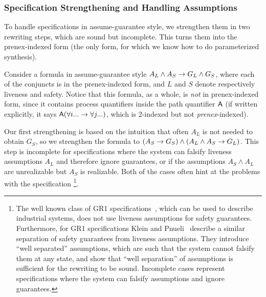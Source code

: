 \subsubsection{Specification Strengthening and Handling Assumptions} \label{tok_rings:sec:localising}

To handle specifications in assume-guarantee style,
we strengthen them in two rewriting steps,
which are sound but incomplete.
This turns them into the prenex-indexed form
(the only form, for which we know how to do parameterized synthesis).

Consider a formula in assume-guarantee style $A_L \land A_S \rightarrow G_L \land G_S$,
where each of the conjuncts is in the prenex-indexed form,
and $L$ and $S$ denote respectively liveness and safety.
Notice that this formula, as a whole,
  is \emph{not} in prenex-indexed form,
  since it contains process quantifiers inside the path quantifier ${\operatorname{\mathsf{A}}}$
  (if written explicitly, it says $\operatorname{\mathsf{A}} (\forall i... \rightarrow \forall j...)$,
  which is 2-indexed but not \emph{prenex}-indexed).

Our first strengthening is based on the intuition that
often $A_L$ is not needed to obtain $G_S$,
so we strengthen the formula to $(A_S \rightarrow G_S) \land (A_L \land A_S \rightarrow G_L)$.
This step is incomplete for specifications where the system can
falsify liveness assumptions $A_L$ and therefore ignore guarantees,
or if the assumptions $A_S \land A_L$ are unrealizable but $A_S$ is realizable.
Both of the cases often hint at the problems with the specification%
\footnote{The well known class of GR1 specifications~\cite{Bloem12},
  which can be used to describe industrial systems,
  does not use liveness assumptions for safety guarantees.
  Furthermore, for GR1 specifications Klein and Pnueli~\cite{Klein10}
  describe a similar separation of safety guarantees from liveness assumptions.
  They introduce ``well separated'' assumptions,
  which are such that the system cannot falsify them at any state,
  and show that ``well separation'' of assumptions is sufficient for the rewriting to be sound.
  Incomplete cases represent specifications where the system can falsify assumptions and ignore guarantees.%
  }.


